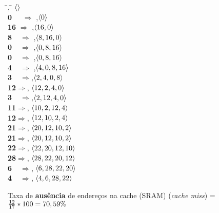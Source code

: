 \begin{tabbing}
  \hspace{3.6cm}\=\cache{\Lambda}{\Lambda}{\Lambda}{\Lambda}, \hspace{3cm}\= $\langle\rangle$
\hspace{.75cm}\\
{\bf 0\ \ } $\Rightarrow$ \miss\>,\>$\langle 0\rangle$ \\
{\bf 16} $\Rightarrow$ \miss\>,\>$\langle 16,0\rangle$\\
{\bf 8\ \ }$\Rightarrow$ \miss\>,\>$\langle 8, 16, 0\rangle$\\
{\bf 0\ \ }$\Rightarrow$ \HIT \> ,\>$\langle 0, 8, 16\rangle$\\
{\bf 0\ \ }$\Rightarrow$ \HIT \> ,\>$\langle 0, 8, 16\rangle$\\
{\bf 4\ \ }$\Rightarrow$\miss\> ,\>$\langle 4, 0 , 8, 16\rangle$\\
{\bf 3\ \ }$\Rightarrow$\miss\>,\>$\langle 2, 4, 0, 8\rangle$\\
{\bf 12}$\Rightarrow$\miss\>,\> $\langle 12, 2, 4, 0\rangle$\\
{\bf 3\ \ }$\Rightarrow$\HIT\>,\>$\langle 2, 12, 4, 0\rangle$\\
{\bf 11}$\Rightarrow$\miss\>,\> $\langle 10, 2, 12, 4\rangle$\\
{\bf 12}$\Rightarrow$\HIT\>,\> $\langle 12, 10, 2, 4\rangle$\\
{\bf 21}$\Rightarrow$\miss\>,\> $\langle 20, 12, 10, 2\rangle$\\
{\bf 21}$\Rightarrow$\HIT\>,\> $\langle 20, 12, 10, 2\rangle$\\
{\bf 22}$\Rightarrow$\miss\>,\> $\langle 22, 20, 12, 10\rangle$\\
{\bf 28}$\Rightarrow$\miss\>,\> $\langle 28, 22, 20, 12\rangle$\\
{\bf 6\ \ }$\Rightarrow$\miss\>,\> $\langle 6, 28, 22, 20\rangle$\\
{\bf 4\ \ }$\Rightarrow$\miss\>,\> $\langle 4, 6, 28, 22\rangle$\\
\end{tabbing}


Taxa de {\bf ausência} de endereços na cache (SRAM) ({\em cache miss}) =
${12 \over 17} * 100 = 70,59\%$ \\

